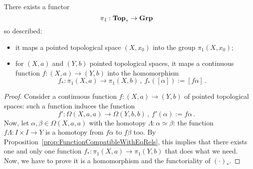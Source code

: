 \begin{proposition}
There exists a functor
\[\pi_1 : \mathbf{Top}_\ast \to \mathbf{Grp}\]
so described:
\begin{itemize}
\item it maps a pointed topological space \((X, x_0)\) into the group \(\pi_1(X, x_0)\);
\item for \((X, a)\) and \((Y, b)\) pointed topological spaces, it maps a continuous function \(f : (X, a) \to (Y, b)\) into the homomorphism
\[f_\ast : \pi_1(X, a) \to \pi_1(X, b)\,, \ f_\ast([\alpha]) := [f\alpha] \,.\]
\end{itemize}
\end{proposition}

\begin{proof}
Consider a continuous function \(f : (X, a) \to (Y, b)\) of pointed topological spaces: such a function induces the function
\[f' : \Omega(X, a, a) \to \Omega(Y, b, b)\,, \ f'(\alpha) := f\alpha\,.\]
Now, let \(\alpha, \beta \in \Omega(X, a, a)\) with the homotopy \(\Lambda : \alpha \simeq \beta\): the function \(f\Lambda : I \times I \to Y\) is a homotopy from \(f\alpha\) to \(f\beta\) too. By Proposition~\ref{prop:FunctionCompatibleWithEqRels}, this implies that there exists one and only one function \(f_\ast : \pi_1(X, a) \to \pi_1(Y, b)\) that does what we need. Now, we have to prove it is a homomorphism and the functoriality of \((\cdot)_\ast\).
\end{proof}


